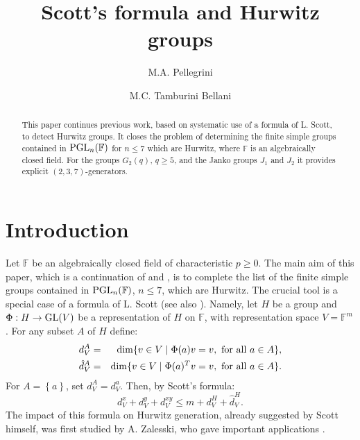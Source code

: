 \documentclass{amsart}
\theoremstyle{remark}
\begin{document}
\title{Scott's formula and Hurwitz groups}

\author{M.A. Pellegrini}

\address{Dipartimento di Matematica e Fisica, Universit\`a Cattolica del Sacro Cuore, Via Musei 41,
I-25121 Brescia, Italy}

\author{M.C. Tamburini Bellani}
\address{Dipartimento di Matematica e Fisica, Universit\`a Cattolica del Sacro Cuore, Via Musei 41,
I-25121 Brescia, Italy}

 

\begin{abstract} 
This paper continues previous work, based on 
systematic use of a formula of L. Scott, to detect Hurwitz groups.
It closes the problem of determining the finite simple groups contained in
${\mathop{\rm PGL}\nolimits}_n({\mathbb{F}})$ for $n\le 7$ which are Hurwitz, where ${\mathbb{F}}$ is an algebraically closed field. 
For the groups $G_2(q)$, $q\ge 5$, and the Janko groups $J_1$
and $J_2$ it provides explicit $(2,3,7)$-generators. 

\end{abstract}

\maketitle

\section{Introduction}

Let ${\mathbb{F}}$ be  an algebraically closed field of characteristic $p\ge 0$.
The main aim of this paper, which is a continuation of \cite{TV1} and \cite{TV2},  
is to complete the list of  the finite simple groups contained in
${\mathop{\rm PGL}\nolimits}_n({\mathbb{F}})$, $n\le 7$,  which are Hurwitz. 
The crucial tool is a special case of a formula of L. Scott \cite{S} (see also \cite{hb}). 
Namely, let $H$ be a group and $\Phi: H \rightarrow {\mathop{\rm GL}\nolimits}(V)$ 
be a representation of $H$ on ${\mathbb{F}}$, with representation space $V={\mathbb{F}}^m$. For any subset $A$ of $H$ define: 
\begin{eqnarray*}
d_V^A & =& {\mathop{\rm dim}\nolimits }\{ v\in V \mid \Phi(a)v=v, \textrm{ for all } a \in A\},\\ 
\hat d_V^A & =& {\mathop{\rm dim}\nolimits }\{ v\in V \mid \Phi(a)^ T v=v, \textrm{ for all } a \in A\}.
\end{eqnarray*}
For $A=\left\{a\right\}$, set $d_V^A=d_V^a$. Then, by Scott's formula: 
\begin{equation}\label{Scott.gen}
d_V^ x+d_V^ y + d_V^ {xy}\leq m+ d_V^ H+\hat d_V^ H. 
\end{equation} 
The impact of this formula on Hurwitz generation, already suggested by Scott himself,
was first studied by A. Zalesski, who gave important applications \cite{DTZ, VZ}.
\end{document}
